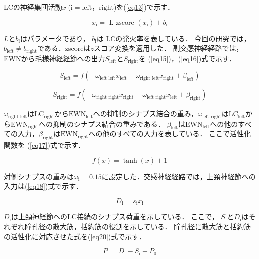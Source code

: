 \documentclass[10pt,twocolumn,a4j]{jsarticle}
\begin{document}
LCの神経集団活動$x_\text{i}$($\text{i}=\text{left}，\text{right}$)を(\ref{eq13})で示す．

\begin{equation}
\label{eq13}
x_\text{i}=\text { L zscore }\left(x_\text{i}\right)+b_\text{i}
\end{equation}

$L$と$b_\text{i}$はパラメータであり， $b_\text{i}$は LCの発火率を表している．
今回の研究では， $b_\text{left} \neq b_\text{right}$である．zscoreは$z$スコア変換を適用した．
副交感神経経路では， EWNから毛様神経経節への出力$S_\text{left}$と$S_\text{right}$を (\ref{eq15})，(\ref{eq16})式で示す．

\begin{equation}
\label{eq15}
S_\text{left}=f\left(-\omega_\text{left~left} x_\text{left}-\omega_\text{right~left} x_\text{right}+\beta_\text{left}\right)
\end{equation}

\begin{equation}
\label{eq16}
S_\text{right}=f\left(-\omega_\text{right~right} x_\text{right}-\omega_\text{left~right} x_\text{left}+\beta_\text{right}\right)
\end{equation}

$\omega_\text{right~left}$は$\text{LC}_\text{right}$から$\text{EWN}_\text{left}$への抑制のシナプス結合の重み，$\omega_\text{left~right}$は$\text{LC}_\text{left}$から$\text{EWN}_\text{right}$への抑制のシナプス結合の重みである． $\beta_\text{left}$は$\text{EWN}_\text{left}$への他のすべての入力，$\beta_\text{right}$は$\text{EWN}_\text{right}$への他のすべての入力を表している．
ここで活性化関数を (\ref{eq17})式で示す．

\begin{equation}
\label{eq17}
f(x)=\tanh (x)+1
\end{equation}

対側シナプスの重みは$\omega_\text{i}=0.15$に設定した．交感神経経路では，上頚神経節への入力は(\ref{eq18})式で示す．

\begin{equation}
\label{eq18}
D_\text{i}=s_\text{i} x_\text{i}
\end{equation}

$D_\text{i}$は上頚神経節へのLC接続のシナプス荷重を示している．
ここで， $S_\text{i}$と$D_\text{i}$はそれぞれ瞳孔径の散大筋，括約筋の役割を示している．
瞳孔径に散大筋と括約筋の活性化に対応させた式を(\ref{eq20})式で示す．

\begin{equation}
\label{eq20}
P_\text{i}=D_\text{i}-S_\text{i}+P_{0}
\end{equation}
\end{document}
